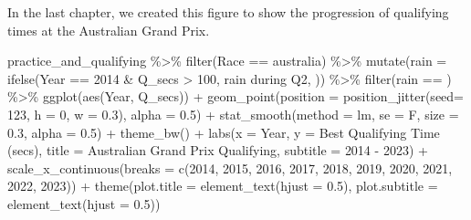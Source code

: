 \documentclass[
]{book}
\newenvironment{Shaded}{\begin{snugshade}}{\end{snugshade}}
\newcommand{\AttributeTok}[1]{\textcolor[rgb]{0.77,0.63,0.00}{#1}}
\newcommand{\DecValTok}[1]{\textcolor[rgb]{0.00,0.00,0.81}{#1}}
\newcommand{\FloatTok}[1]{\textcolor[rgb]{0.00,0.00,0.81}{#1}}
\newcommand{\FunctionTok}[1]{\textcolor[rgb]{0.00,0.00,0.00}{#1}}
\newcommand{\NormalTok}[1]{#1}
\newcommand{\SpecialCharTok}[1]{\textcolor[rgb]{0.00,0.00,0.00}{#1}}
\newcommand{\StringTok}[1]{\textcolor[rgb]{0.31,0.60,0.02}{#1}}
\begin{document}
In the last chapter, we created this figure to show the progression of qualifying times at the Australian Grand Prix.

\begin{Shaded}
\begin{Highlighting}[]
\NormalTok{practice\_and\_qualifying }\SpecialCharTok{\%\textgreater{}\%}
  \FunctionTok{filter}\NormalTok{(Race }\SpecialCharTok{==} \StringTok{\textquotesingle{}australia\textquotesingle{}}\NormalTok{) }\SpecialCharTok{\%\textgreater{}\%}
  \FunctionTok{mutate}\NormalTok{(}\AttributeTok{rain =} \FunctionTok{ifelse}\NormalTok{(Year }\SpecialCharTok{==} \DecValTok{2014} \SpecialCharTok{\&}\NormalTok{ Q\_secs }\SpecialCharTok{\textgreater{}} \DecValTok{100}\NormalTok{, }\StringTok{\textquotesingle{}rain during Q2\textquotesingle{}}\NormalTok{, }\StringTok{\textquotesingle{} \textquotesingle{}}\NormalTok{)) }\SpecialCharTok{\%\textgreater{}\%} 
  \FunctionTok{filter}\NormalTok{(rain }\SpecialCharTok{==} \StringTok{\textquotesingle{} \textquotesingle{}}\NormalTok{) }\SpecialCharTok{\%\textgreater{}\%} 
  \FunctionTok{ggplot}\NormalTok{(}\FunctionTok{aes}\NormalTok{(Year, Q\_secs)) }\SpecialCharTok{+}
  \FunctionTok{geom\_point}\NormalTok{(}\AttributeTok{position =} \FunctionTok{position\_jitter}\NormalTok{(}\AttributeTok{seed=} \DecValTok{123}\NormalTok{, }\AttributeTok{h =} \DecValTok{0}\NormalTok{, }\AttributeTok{w =} \FloatTok{0.3}\NormalTok{), }\AttributeTok{alpha =} \FloatTok{0.5}\NormalTok{) }\SpecialCharTok{+}
  \FunctionTok{stat\_smooth}\NormalTok{(}\AttributeTok{method =} \StringTok{\textquotesingle{}lm\textquotesingle{}}\NormalTok{, }\AttributeTok{se =}\NormalTok{ F, }\AttributeTok{size =} \FloatTok{0.3}\NormalTok{, }\AttributeTok{alpha =} \FloatTok{0.5}\NormalTok{) }\SpecialCharTok{+} 
  \FunctionTok{theme\_bw}\NormalTok{() }\SpecialCharTok{+}
  \FunctionTok{labs}\NormalTok{(}\AttributeTok{x =} \StringTok{\textquotesingle{}Year\textquotesingle{}}\NormalTok{,}
       \AttributeTok{y =} \StringTok{\textquotesingle{}Best Qualifying Time (secs)\textquotesingle{}}\NormalTok{,}
       \AttributeTok{title =} \StringTok{\textquotesingle{}Australian Grand Prix Qualifying\textquotesingle{}}\NormalTok{,}
       \AttributeTok{subtitle =} \StringTok{\textquotesingle{}2014 {-} 2023\textquotesingle{}}\NormalTok{) }\SpecialCharTok{+}
  \FunctionTok{scale\_x\_continuous}\NormalTok{(}\AttributeTok{breaks =} \FunctionTok{c}\NormalTok{(}\DecValTok{2014}\NormalTok{, }\DecValTok{2015}\NormalTok{, }\DecValTok{2016}\NormalTok{, }\DecValTok{2017}\NormalTok{, }\DecValTok{2018}\NormalTok{, }\DecValTok{2019}\NormalTok{, }\DecValTok{2020}\NormalTok{, }\DecValTok{2021}\NormalTok{, }\DecValTok{2022}\NormalTok{, }\DecValTok{2023}\NormalTok{)) }\SpecialCharTok{+}
  \FunctionTok{theme}\NormalTok{(}\AttributeTok{plot.title =} \FunctionTok{element\_text}\NormalTok{(}\AttributeTok{hjust =} \FloatTok{0.5}\NormalTok{),}
        \AttributeTok{plot.subtitle =} \FunctionTok{element\_text}\NormalTok{(}\AttributeTok{hjust =} \FloatTok{0.5}\NormalTok{))}
\end{Highlighting}
\end{Shaded}
\end{document}
